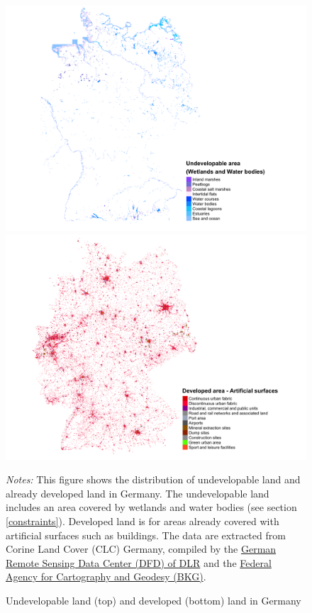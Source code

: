 \documentclass[
  12pt,
]{article}
\begin{document}
\begin{figure}[H]
\centering

\begin{center}\includegraphics[width=1\linewidth,height=1\textheight]{output/figs/undevelopable-land} \includegraphics[width=1\linewidth,height=1\textheight]{output/figs/developed-land} \end{center}

\caption{Undevelopable land (top) and developed (bottom) land in Germany}
\medskip
\begin{minipage}{0.9\textwidth}
\footnotesize
\textit{Notes:} This figure shows the distribution of undevelopable land and already developed land in Germany. The undevelopable land includes an area covered by wetlands and water bodies (see section \ref{constraints}). Developed land is for areas already covered with artificial surfaces such as buildings. 
The data are extracted from Corine Land Cover (CLC) Germany, compiled by the \hyperlink{https://www.dlr.de/eoc/en/desktopdefault.aspx/tabid-11882/20871_read-48836}{German Remote Sensing Data Center (DFD) of DLR} and the \hyperlink{https://www.bkg.bund.de}{Federal Agency for Cartography and Geodesy (BKG)}.
\end{minipage}
\end{figure}
\end{document}
